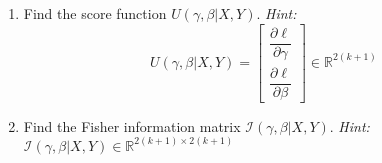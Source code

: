 \documentclass[11pt]{article}
\begin{document}
\begin{enumerate}
\begin{enumerate}
\item Find the score function $U(\gamma, \beta | X, Y)$. \textit{Hint:} 
$$U(\gamma, \beta | X, Y) = \begin{bmatrix}
\dfrac{\partial \ell}{\partial \gamma} \\
\dfrac{\partial \ell}{\partial \beta}
\end{bmatrix} \in \mathbb{R}^{2(k+1)}$$

\item  Find the Fisher information matrix $\mathcal{I}(\gamma, \beta | X, Y)$. \textit{Hint:} $\mathcal{I}(\gamma, \beta | X, Y) \in \mathbb{R}^{2(k+1) \times 2(k+1)}$
\end{enumerate}

\end{enumerate}
\end{document}

